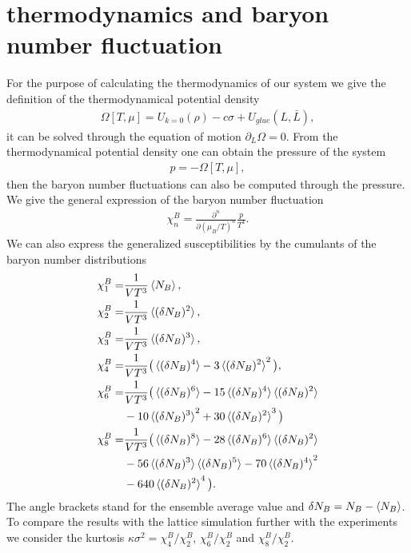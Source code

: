 \documentclass[%
reprint,
superscriptaddress,
showpacs,preprintnumbers,
 amsmath,amssymb,
 aps,
prd,
]{revtex4-1}
\begin{document}
\section{thermodynamics and baryon number fluctuation}
\label{sec:BNF}
For the purpose of calculating the thermodynamics of our system we give the definition of the thermodynamical potential density 
\begin{align}
\Omega[T,\mu]=U_{k=0}(\rho)-c\sigma+U_{glue}(L,\bar{L}),
\end{align} 
it can be solved through the equation of motion $\partial_L\Omega=0$.
From the thermodynamical potential density one can obtain the pressure of the system
\begin{align}
p=-\Omega[T,\mu],
\end{align}
then the baryon number fluctuations can also be computed through the pressure. We give the general expression of the baryon number fluctuation
\begin{align}
\chi^B_n=\frac{\partial^n}{\partial(\mu_B/T)^n}\frac{p}{T^4}.
\end{align}
We can also express the generalized susceptibilities by the cumulants of the baryon number distributions
\begin{align}
\chi^B_1=&\frac{1}{VT^3}\braket{N_B},\\
\chi^B_2=&\frac{1}{VT^3}\braket{(\delta N_B)^2},\\
\chi^B_3=&\frac{1}{VT^3}\braket{(\delta N_B)^3},\\
\chi^B_4=&\frac{1}{VT^3}\big(\braket{(\delta N_B)^4}-3\braket{(\delta N_B)^2}^2\big),\\
\chi^B_6=&\frac{1}{VT^3}\big(\braket{(\delta N_B)^6}-15\braket{(\delta N_B)^4}\braket{(\delta N_B)^2}\nonumber\\
&-10\braket{(\delta N_B)^3}^2+30\braket{(\delta N_B)^2}^3\big)\\
\chi^B_8=&\frac{1}{VT^3}\big(\braket{(\delta N_B)^8}-28\braket{(\delta N_B)^6}\braket{(\delta N_B)^2}\nonumber\\
&-56\braket{(\delta N_B)^3}\braket{(\delta N_B)^5}-70\braket{(\delta N_B)^4}^2\nonumber\\
&-640\braket{(\delta N_B)^2}^4\big).
\end{align}
The angle brackets stand for the ensemble average value and $\delta N_B=N_B-\braket{N_B}$. To compare the results with the lattice simulation further with the experiments we consider the kurtosis $\kappa\sigma^2=\chi^B_4/\chi^B_2$, $\chi^B_6/\chi^B_2$ and $\chi^B_8/\chi^B_2$.
\end{document}
